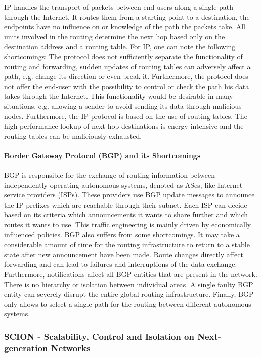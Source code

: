 IP handles the transport of packets between end-users along a single path through the Internet. It routes them from a starting point to a destination, the endpoints have no influence on or knowledge of the path the packets take. All units involved in the routing determine the next hop based only on the destination address and a routing table. For IP, one can note the following shortcomings: The protocol does not sufficiently separate the functionality of routing and forwarding, sudden updates of routing tables can adversely affect a path, e.g. change its direction or even break it. Furthermore, the protocol does not offer the end-user with the possibility to control or check the path his data takes through the Internet. This functionality would be desirable in many situations, e.g. allowing a sender to avoid sending its data through malicious nodes. Furthermore, the IP protocol is based on the use of routing tables. The high-performance lookup of next-hop destinations is energy-intensive and the routing tables can be maliciously exhausted.

\paragraph{Border Gateway Protocol (BGP) and its Shortcomings}

BGP is responsible for the exchange of routing information between independently operating autonomous systems, denoted as ASes, like Internet service providers (ISPs). These providers use BGP update messages to announce the IP prefixes which are reachable through their subnet. Each ISP can decide based on its criteria which announcements it wants to share further and which routes it wants to use. This traffic engineering is mainly driven by economically influenced policies. BGP also suffers from some shortcomings. It may take a considerable amount of time for the routing infrastructure to return to a stable state after new announcement have been made. Route changes directly affect forwarding and can lead to failures and interruptions of the data exchange. Furthermore, notifications affect all BGP entities that are present in the network. There is no hierarchy or isolation between individual areas. A single faulty BGP entity can severely disrupt the entire global routing infrastructure. Finally, BGP only allows to select a single path for the routing between different autonomous systems.  

\subsubsection{SCION - Scalability, Control and Isolation on Next-generation Networks}


